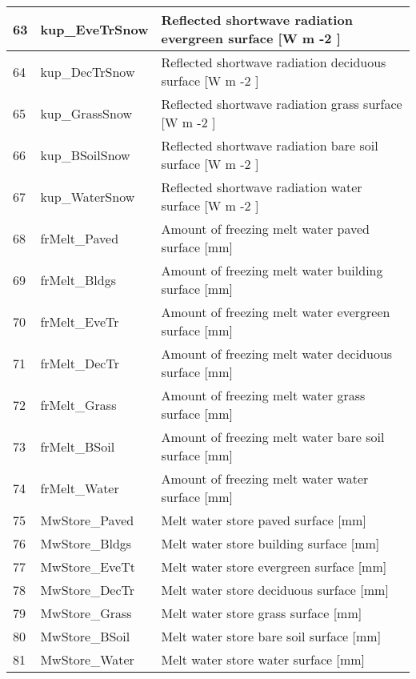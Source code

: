 \documentclass[letterpaper,10pt,english]{sphinxmanual}
\begin{document}
\begin{savenotes}
\begin{longtable}{|l|l|l|}
\\
\hline
63
&
kup\_EveTrSnow
&
Reflected shortwave radiation \textendash{} evergreen surface {[}W m -2 {]}
\\
\hline
64
&
kup\_DecTrSnow
&
Reflected shortwave radiation \textendash{} deciduous surface {[}W m -2 {]}
\\
\hline
65
&
kup\_GrassSnow
&
Reflected shortwave radiation \textendash{} grass surface {[}W m -2 {]}
\\
\hline
66
&
kup\_BSoilSnow
&
Reflected shortwave radiation \textendash{} bare soil surface {[}W m -2 {]}
\\
\hline
67
&
kup\_WaterSnow
&
Reflected shortwave radiation \textendash{} water surface {[}W m -2 {]}
\\
\hline
68
&
frMelt\_Paved
&
Amount of freezing melt water \textendash{} paved surface {[}mm{]}
\\
\hline
69
&
frMelt\_Bldgs
&
Amount of freezing melt water \textendash{} building surface {[}mm{]}
\\
\hline
70
&
frMelt\_EveTr
&
Amount of freezing melt water \textendash{} evergreen surface {[}mm{]}
\\
\hline
71
&
frMelt\_DecTr
&
Amount of freezing melt water \textendash{} deciduous surface {[}mm{]}
\\
\hline
72
&
frMelt\_Grass
&
Amount of freezing melt water \textendash{} grass surface {[}mm{]}
\\
\hline
73
&
frMelt\_BSoil
&
Amount of freezing melt water \textendash{} bare soil surface {[}mm{]}
\\
\hline
74
&
frMelt\_Water
&
Amount of freezing melt water \textendash{} water surface {[}mm{]}
\\
\hline
75
&
MwStore\_Paved
&
Melt water store \textendash{} paved surface {[}mm{]}
\\
\hline
76
&
MwStore\_Bldgs
&
Melt water store \textendash{} building surface {[}mm{]}
\\
\hline
77
&
MwStore\_EveTt
&
Melt water store \textendash{} evergreen surface {[}mm{]}
\\
\hline
78
&
MwStore\_DecTr
&
Melt water store \textendash{} deciduous surface {[}mm{]}
\\
\hline
79
&
MwStore\_Grass
&
Melt water store \textendash{} grass surface {[}mm{]}
\\
\hline
80
&
MwStore\_BSoil
&
Melt water store \textendash{} bare soil surface {[}mm{]}
\\
\hline
81
&
MwStore\_Water
&
Melt water store \textendash{} water surface {[}mm{]}

\end{longtable}
\end{savenotes}
\end{document}
